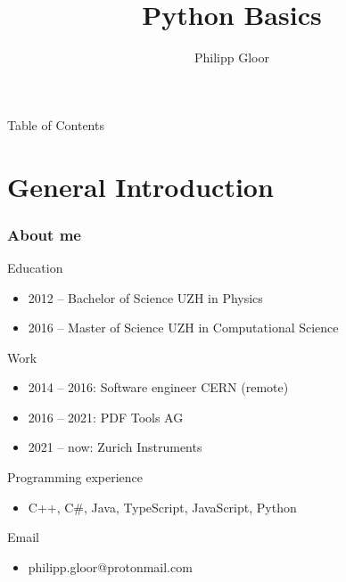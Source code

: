 \documentclass[10pt, a4paper]{beamer} %
\title %
{Python Basics}
\author %
{Philipp Gloor\inst{1}}
\institute
{
  \inst{1}%
  University of Zurich
}
\date{}
\begin{document}
\begin{frame}
  \titlepage
\end{frame}

\begin{frame}{Table of Contents}
  \tableofcontents
\end{frame}
\section{General Introduction}
\begin{frame}
  \frametitle{About me}

  \begin{block}{Education}
    \begin{itemize}
      \item 2012 -- Bachelor of Science UZH in Physics
      \item 2016 -- Master of Science UZH in Computational Science
    \end{itemize}
  \end{block}

  \begin{block}{Work}
    \begin{itemize}
      \item 2014 -- 2016: Software engineer CERN (remote)
      \item 2016 -- 2021: PDF Tools AG
      \item 2021 -- now: Zurich Instruments
    \end{itemize}
  \end{block}

  \begin{block}{Programming experience}
    \begin{itemize}
      \item[] C++, C\#, Java, TypeScript, JavaScript, Python
    \end{itemize}
  \end{block}

  \begin{block}{Email}
    \begin{itemize}
      \item[] philipp.gloor@protonmail.com
    \end{itemize}

  \end{block}




\end{frame}
\end{document}
